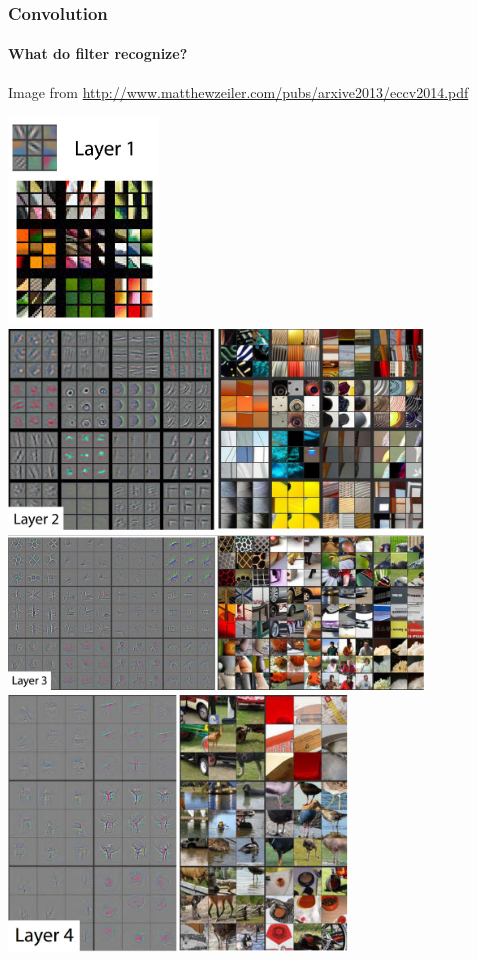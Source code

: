 \documentclass[9pt]{beamer}
\begin{document}
\begin{frame}
  \frametitle{Convolution}

  \framesubtitle{What do filter recognize?}
  
  {\small Image from \url{http://www.matthewzeiler.com/pubs/arxive2013/eccv2014.pdf}}

  \begin{center}
    \begin{overprint}
       \includegraphics[width = 4cm]{images/cnn_vizu_l1.jpg}
       \includegraphics[width = 11cm]{images/cnn_vizu_l2.jpg}
       \includegraphics[width = 11cm]{images/cnn_vizu_l3.jpg}
       \includegraphics[width = 9cm]{images/cnn_vizu_l4.jpg}

\end{overprint}
\end{center}
\end{frame}
\end{document}
